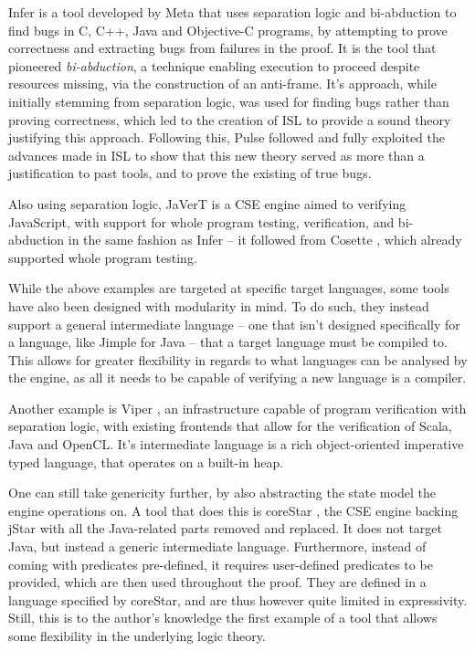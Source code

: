 Infer \cite{infer} is a tool developed by Meta that uses separation logic and bi-abduction to find bugs in C, C++, Java and Objective-C programs, by attempting to prove correctness and extracting bugs from failures in the proof. It is the tool that pioneered \emph{bi-abduction}, a technique enabling execution to proceed despite resources missing, via the construction of an anti-frame. It's approach, while initially stemming from separation logic, was used for finding bugs rather than proving correctness, which led to the creation of ISL \cite{isl} to provide a sound theory justifying this approach. Following this, Pulse \cite{pulse} followed and fully exploited the advances made in ISL to show that this new theory served as more than a justification to past tools, and to prove the existing of true bugs.

Also using separation logic, JaVerT \cite{javert1, javert2} is a CSE engine aimed to verifying JavaScript, with support for whole program testing, verification, and bi-abduction in the same fashion as Infer -- it followed from Cosette \cite{cosette}, which already supported whole program testing.

While the above examples are targeted at specific target languages, some tools have also been designed with modularity in mind. To do such, they instead support a general intermediate language -- one that isn't designed specifically for a language, like Jimple for Java -- that a target language must be compiled to. This allows for greater flexibility in regards to what languages can be analysed by the engine, as all it needs to be capable of verifying a new language is a compiler.

Another example is Viper \cite{viper}, an infrastructure capable of program verification with separation logic, with existing frontends that allow for the verification of Scala, Java and OpenCL. It's intermediate language is a rich object-oriented imperative typed language, that operates on a built-in heap.


One can still take genericity further, by also abstracting the state model the engine operations on. A tool that does this is coreStar \cite{corestar}, the CSE engine backing jStar with all the Java-related parts removed and replaced. It does not target Java, but instead a generic intermediate language. Furthermore, instead of coming with predicates pre-defined, it requires user-defined predicates to be provided, which are then used throughout the proof. They are defined in a language specified by coreStar, and are thus however quite limited in expressivity. Still, this is to the author's knowledge the first example of a tool that allows some flexibility in the underlying logic theory.

